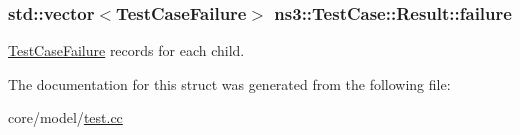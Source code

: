 \subsubsection[{\texorpdfstring{failure}{failure}}]{\setlength{\rightskip}{0pt plus 5cm}std\+::vector$<${\bf Test\+Case\+Failure}$>$ ns3\+::\+Test\+Case\+::\+Result\+::failure}\hypertarget{structns3_1_1TestCase_1_1Result_a2786d592a2966465ad4a5cc623447903}{}\label{structns3_1_1TestCase_1_1Result_a2786d592a2966465ad4a5cc623447903}
\hyperlink{structns3_1_1TestCaseFailure}{Test\+Case\+Failure} records for each child. 

The documentation for this struct was generated from the following file\+:\begin{DoxyCompactItemize}
\item 
core/model/\hyperlink{test_8cc}{test.\+cc}\end{DoxyCompactItemize}
